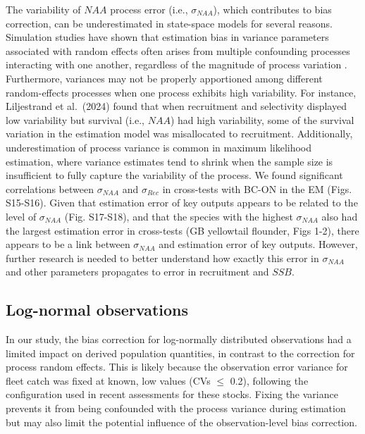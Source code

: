 \documentclass[
  12pt,
]{article}
\begin{document}
The variability of \(NAA\) process error (i.e., \(\sigma_{NAA}\)), which
contributes to bias correction, can be underestimated in state-space
models for several reasons. Simulation studies have shown that
estimation bias in variance parameters associated with random effects
often arises from multiple confounding processes interacting with one
another, regardless of the magnitude of process variation
\citep{Li2024,Liljestrand2024}. Furthermore, variances may not be
properly apportioned among different random-effects processes when one
process exhibits high variability. For instance, Liljestrand et
al.~(2024) found that when recruitment and selectivity displayed low
variability but survival (i.e., \(NAA\)) had high variability, some of
the survival variation in the estimation model was misallocated to
recruitment. Additionally, underestimation of process variance is common
in maximum likelihood estimation, where variance estimates tend to
shrink when the sample size is insufficient to fully capture the
variability of the process. We found significant correlations between
\(\sigma_{NAA}\) and \(\sigma_{Rec}\) in cross-tests with BC-ON in the
EM (Figs. S15-S16). Given that estimation error of key outputs appears
to be related to the level of \(\sigma_{NAA}\) (Fig. S17-S18), and that
the species with the highest \(\sigma_{NAA}\) also had the largest
estimation error in cross-tests (GB yellowtail flounder, Figs 1-2),
there appears to be a link between \(\sigma_{NAA}\) and estimation error
of key outputs. However, further research is needed to better understand
how exactly this error in \(\sigma_{NAA}\) and other parameters
propagates to error in recruitment and \(SSB\).

\hypertarget{log-normal-observations}{%
\subsection{Log-normal observations}\label{log-normal-observations}}

In our study, the bias correction for log-normally distributed
observations had a limited impact on derived population quantities, in
contrast to the correction for process random effects. This is likely
because the observation error variance for fleet catch was fixed at
known, low values (CVs \(\le\) 0.2), following the configuration used in
recent assessments for these stocks. Fixing the variance prevents it
from being confounded with the process variance during estimation but
may also limit the potential influence of the observation-level bias
correction.
\end{document}
